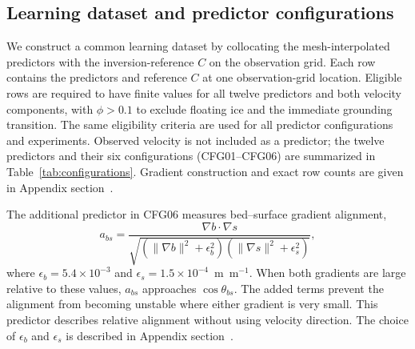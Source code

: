 \documentclass[review,jog]{igs}
\begin{document}
\subsection{Learning dataset and predictor configurations}

We construct a common learning dataset by collocating the mesh-interpolated predictors with the inversion-reference $C$ on the observation grid. Each row contains the predictors and reference $C$ at one observation-grid location. Eligible rows are required to have finite values for all twelve predictors and both velocity components, with $\phi>0.1$ to exclude floating ice and the immediate grounding transition. The same eligibility criteria are used for all predictor configurations and experiments. Observed velocity is not included as a predictor; the twelve predictors and their six configurations (CFG01--CFG06) are summarized in Table~\ref{tab:configurations}. Gradient construction and exact row counts are given in Appendix section~.
 
The additional predictor in CFG06 measures bed--surface gradient alignment,
\begin{equation}
\label{eq:alignment}
a_{bs}=
\frac{\nabla b\cdot\nabla s}
{\sqrt{\left(\lVert\nabla b\rVert^2+\epsilon_b^2\right)
\left(\lVert\nabla s\rVert^2+\epsilon_s^2\right)}},
\end{equation}
where $\epsilon_b=5.4\times10^{-3}$ and
$\epsilon_s=1.5\times10^{-4}$~m~m$^{-1}$. When both gradients are large
relative to these values, $a_{bs}$ approaches $\cos\theta_{bs}$. The added terms prevent the alignment from becoming unstable where either gradient is very small. This predictor describes relative alignment
without using velocity direction. The choice of $\epsilon_b$ and $\epsilon_s$
is described in Appendix section~.
\end{document}
